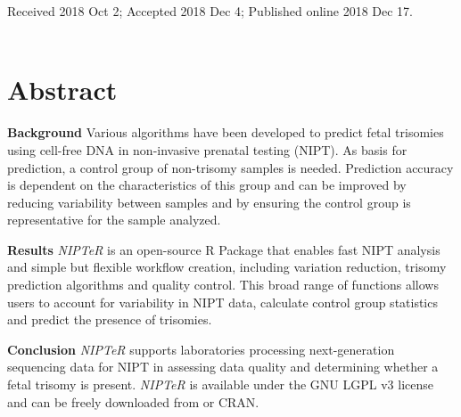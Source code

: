 \noindent
Received 2018 Oct 2; Accepted 2018 Dec 4; Published online 2018 Dec 17.
\\~\\


\section*{Abstract}\label{abstract}
\textbf{Background}
Various algorithms have been developed to predict fetal trisomies using cell-free DNA in non-invasive prenatal testing (NIPT). 
As basis for prediction, a control group of non-trisomy samples is needed. Prediction accuracy is dependent on the characteristics of this group and can be improved by reducing variability between samples and by ensuring the control group is representative for the sample analyzed.

\noindent\textbf{Results}
\textsl{NIPTeR} is an open-source R Package that enables fast NIPT analysis and simple but flexible workflow creation, including variation reduction, trisomy prediction algorithms and quality control. This broad range of functions allows users to account for variability in NIPT data, calculate control group statistics and predict the presence of trisomies.

\noindent\textbf{Conclusion}
\textsl{NIPTeR} supports laboratories processing next-generation sequencing data for NIPT in assessing data quality and determining whether a fetal trisomy is present. \textsl{NIPTeR} is available under the GNU LGPL v3 license and can be freely downloaded from  or CRAN.


